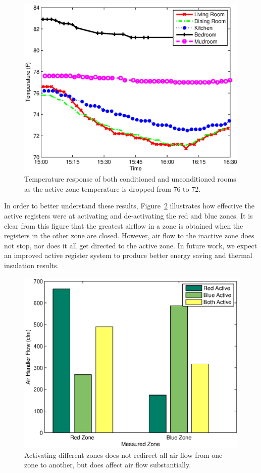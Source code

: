 \begin{figure}[ht]
  \centering
  \includegraphics[width=0.6\columnwidth]{fig/houseTempRes.eps}
  \caption[Temperature Response of Conditioned and Unconditioned
    Rooms]{Temperature response of both conditioned and unconditioned rooms as
    the active zone temperature is dropped from 76 to 72.}
  \label{fig:houseTempRes}
\end{figure}

In order to better understand these results, Figure~\ref{fig:airflowBar}
illustrates how effective the active registers were at activating and
de-activating the red and blue zones.  It is clear from this figure that the
greatest airflow in a zone is obtained when the registers in the other zone are
closed.  However, air flow to the inactive zone does not stop, nor does it all
get directed to the active zone.  In future work, we expect an improved active
register system to produce better energy saving and thermal insulation results.

\begin{figure}[ht]
  \centering
  \includegraphics[width=0.6\columnwidth]{fig/airflowBar.eps}
  \caption[Effect of Zoning on Airflow]{Activating different zones does not
    redirect all air flow from one zone to another, but does affect air flow
    substantially.}
  \label{fig:airflowBar}
\end{figure}

